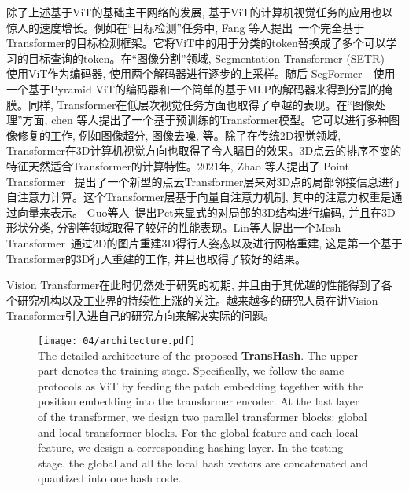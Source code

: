 除了上述基于ViT的基础主干网络的发展, 基于ViT的计算机视觉任务的应用也以惊人的速度增长。例如在``目标检测''任务中, Fang 等人提出~\cite{fang2021you}一个完全基于Transformer的目标检测框架。它将ViT中的用于分类的token替换成了多个可以学习的目标查询的token。在``图像分割''领域, Segmentation Transformer (SETR)~\cite{zheng2021rethinking} 使用ViT作为编码器, 使用两个解码器进行逐步的上采样。随后 SegFormer~\cite{strudel2021segmenter}~使用一个基于Pyramid ViT的编码器和一个简单的基于MLP的解码器来得到分割的掩膜。同样, Transformer在低层次视觉任务方面也取得了卓越的表现。在``图像处理''方面, chen 等人提出了一个基于预训练的Transformer模型。它可以进行多种图像修复的工作, 例如图像超分, 图像去噪, 等。除了在传统2D视觉领域, Transformer在3D计算机视觉方向也取得了令人瞩目的效果。3D点云的排序不变的特征天然适合Transformer的计算特性。2021年, Zhao 等人提出了 Point Transformer~\cite{zhao2021point} 提出了一个新型的点云Transformer层来对3D点的局部邻接信息进行自注意力计算。这个Transformer层基于向量自注意力机制, 其中的注意力权重是通过向量来表示。
Guo等人~\cite{guo2021pct}提出Pct来显式的对局部的3D结构进行编码, 并且在3D形状分类, 分割等领域取得了较好的性能表现。Lin等人提出一个Mesh Transformer~\cite{lin2021end}通过2D的图片重建3D得行人姿态以及进行网格重建, 这是第一个基于Transformer的3D行人重建的工作, 并且也取得了较好的结果。\par
Vision Transformer在此时仍然处于研究的初期, 并且由于其优越的性能得到了各个研究机构以及工业界的持续性上涨的关注。越来越多的研究人员在讲Vision Transformer引入进自己的研究方向来解决实际的问题。

\begin{figure}[!htp]
    \centering
    \texttt{[image: 04/architecture.pdf]} \\
      {The detailed architecture of the proposed \textbf{TransHash}. The upper part denotes the training stage. Specifically, we follow the same protocols as ViT by feeding the patch embedding together with the position embedding into the transformer encoder. At the last layer of the transformer, we design two parallel transformer blocks: global and local transformer blocks.  For the global feature and each local feature, we design a corresponding hashing layer. In the testing stage, the global and all the local hash vectors are concatenated and quantized into one hash code.}
   \label{fig:mainarch}
\end{figure} 

